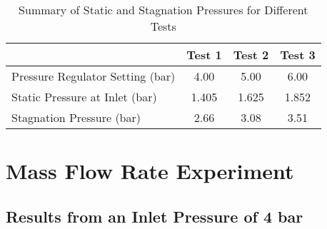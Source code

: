 \begin{table}[htbp]
    \centering
    \begin{tabular}{l c c c}
        \hline
        & Test 1 & Test 2 & Test 3 \\
        \hline
        Pressure Regulator Setting (bar) & 4.00 & 5.00 & 6.00 \\
        Static Pressure at Inlet (bar) & 1.405 & 1.625 & 1.852 \\
        Stagnation Pressure (bar) & 2.66 & 3.08 & 3.51 \\
        \hline
    \end{tabular}
    \caption{Summary of Static and Stagnation Pressures for Different Tests}\label{tab:static-stag-pressures}
\end{table}


\newpage

\section{Mass Flow Rate Experiment}
\subsection{Results from an Inlet Pressure of 4 bar}
\vfill

